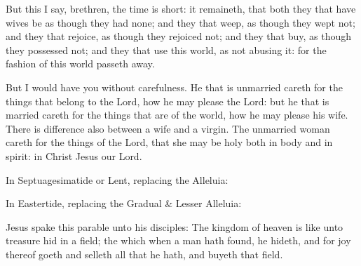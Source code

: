 But this I say, brethren, the time is short: it remaineth, that both they that have wives be as though they had none; and they that weep, as though they wept not; and they that rejoice, as though they rejoiced not; and they that buy, as though they possessed not; and they that use this world, as not abusing it: for the fashion of this world passeth away.

But I would have you without carefulness. He that is unmarried careth for the things that belong to the Lord, how he may please the Lord: but he that is married careth for the things that are of the world, how he may please his wife. There is difference also between a wife and a virgin. The unmarried woman careth for the things of the Lord, that she may be holy both in body and in spirit: in Christ Jesus our Lord.



\begin{rubric}
{In Septuagesimatide or Lent, replacing the Alleluia:}
\end{rubric}

\vspace{-1ex}


\begin{rubric}
{In Eastertide, replacing the Gradual \& Lesser Alleluia:}
\end{rubric}

\vspace{-1ex}


 Jesus spake this parable unto his disciples: The kingdom of heaven is like unto treasure hid in a field; the which when a man hath found, he hideth, and for joy thereof goeth and selleth all that he hath, and buyeth that field.

